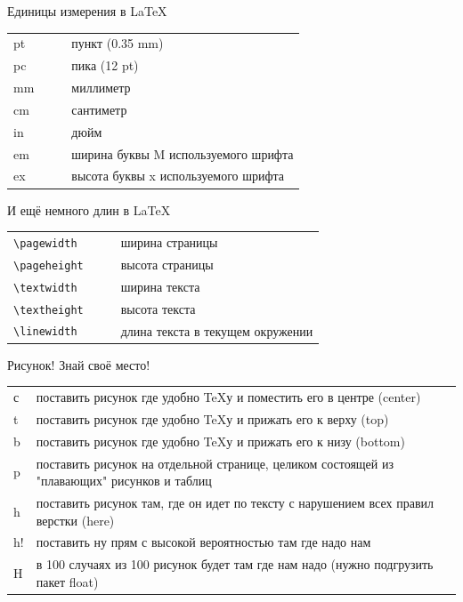 \documentclass[aspectratio=169]{beamer} %
\begin{document}
\begin{frame}[fragile]{ }
\begin{block}{Единицы измерения в \LaTeX}
\centering 
	\begin{tabulary}{\textwidth}{JccL}
		\toprule
			pt & & &пункт (0.35 mm) \\
			pc & & &пика  (12 pt)   \\
			mm & & &миллиметр       \\
			cm & & &сантиметр       \\
			in & & &дюйм            \\
			em & & &ширина буквы M используемого шрифта \\
			ex & & &высота буквы x используемого шрифта \\
		\bottomrule
	\end{tabulary}
\end{block}
\end{frame}


\begin{frame}[fragile]{ }
\begin{block}{И ещё немного длин в \LaTeX}
\centering 
	\begin{tabulary}{\textwidth}{JccL}
		\toprule
			\verb|\pagewidth|  & & &ширина страницы \\
			\verb|\pageheight| & & &высота страницы \\
			\verb|\textwidth|  & & &ширина текста   \\
			\verb|\textheight| & & &высота текста   \\
			\verb|\linewidth|  & & & длина текста в текущем окружении \\
		\bottomrule
	\end{tabulary}
\end{block}
\end{frame} 

\begin{frame}[fragile]{ }
\begin{block}{Рисунок! Знай своё место!}
\centering 
	\begin{tabulary}{\textwidth}{JL}
		\toprule
			с & поставить рисунок где удобно \TeX у и поместить его в центре (center) \\
			t & поставить рисунок где удобно \TeX у и прижать его к верху (top) \\
			b & поставить рисунок где удобно \TeX у и прижать его к низу   (bottom) \\
			p & поставить рисунок на отдельной странице, целиком состоящей из "плавающих" рисунков и таблиц \\
			h & поставить рисунок там, где он идет по тексту с нарушением всех правил верстки (here)  \\
		    h! & поставить ну прям с высокой вероятностью там где надо нам \\
			H & в 100 случаях из 100 рисунок будет там где нам надо (нужно подгрузить пакет float) \\
		\bottomrule
	\end{tabulary}
\end{block}
\end{frame} 
\end{document}
